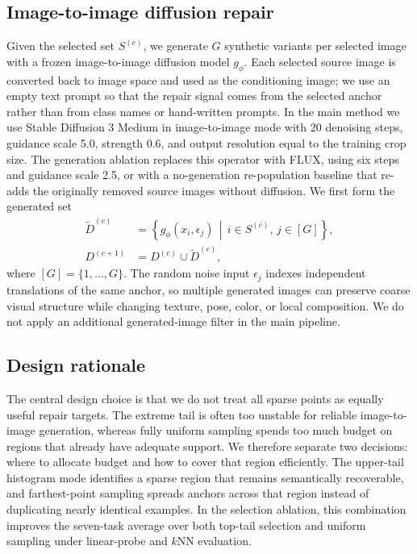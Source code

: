 \documentclass{article}
\begin{document}
\subsection{Image-to-image diffusion repair}
Given the selected set $S^{(c)}$, we generate $G$ synthetic variants per selected image with a frozen image-to-image diffusion model $g_{\phi}$. Each selected source image is converted back to image space and used as the conditioning image; we use an empty text prompt so that the repair signal comes from the selected anchor rather than from class names or hand-written prompts. In the main method we use Stable Diffusion 3 Medium in image-to-image mode with 20 denoising steps, guidance scale 5.0, strength 0.6, and output resolution equal to the training crop size. The generation ablation replaces this operator with FLUX, using six steps and guidance scale 2.5, or with a no-generation re-population baseline that re-adds the originally removed source images without diffusion. We first form the generated set
\begin{equation}
    \begin{aligned}
        \widetilde{D}^{(c)} &= \left\{ g_{\phi}(x_i, \epsilon_j) \,\middle|\, i \in S^{(c)},\, j \in [G] \right\}, \\
        D^{(c+1)} &= D^{(c)} \cup \widetilde{D}^{(c)},
    \end{aligned}
\end{equation}
where $[G] = \{1, \dots, G\}$.
The random noise input $\epsilon_j$ indexes independent translations of the same anchor, so multiple generated images can preserve coarse visual structure while changing texture, pose, color, or local composition. We do not apply an additional generated-image filter in the main pipeline.

\subsection{Design rationale}
The central design choice is that we do not treat all sparse points as equally useful repair targets. The extreme tail is often too unstable for reliable image-to-image generation, whereas fully uniform sampling spends too much budget on regions that already have adequate support. We therefore separate two decisions: where to allocate budget and how to cover that region efficiently. The upper-tail histogram mode identifies a sparse region that remains semantically recoverable, and farthest-point sampling spreads anchors across that region instead of duplicating nearly identical examples. In the selection ablation, this combination improves the seven-task average over both top-tail selection and uniform sampling under linear-probe and $k$NN evaluation.
\end{document}
